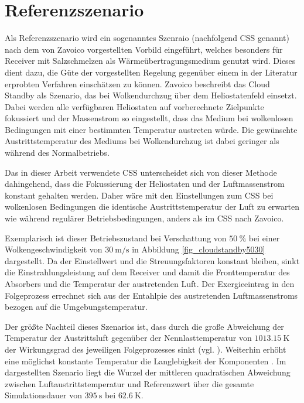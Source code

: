 \section{Referenzszenario} \label{sec_Referenzszenario}
Als Referenzszenario wird ein sogenanntes  Szenraio (nachfolgend CSS genannt) nach dem von Zavoico \cite[S.25ff]{Zavoico} vorgestellten Vorbild eingeführt, welches besonders für Receiver mit Salzschmelzen als Wärmeübertragungsmedium genutzt wird.
Dieses dient dazu, die Güte der vorgestellten Regelung gegenüber einem in der Literatur erprobten Verfahren einschätzen zu können.
Zavoico beschreibt das Cloud Standby als Szenario, das bei Wolkendurchzug über dem Heliostatenfeld einsetzt.
Dabei werden alle verfügbaren Heliostaten auf vorberechnete Zielpunkte fokussiert und der Massenstrom so eingestellt, dass das Medium bei wolkenlosen Bedingungen mit einer bestimmten Temperatur austreten würde.
Die gewünschte Austrittstemperatur des Mediums bei Wolkendurchzug ist dabei geringer als während des Normalbetriebs.

Das in dieser Arbeit verwendete CSS unterscheidet sich von dieser Methode dahingehend, dass die Fokussierung der Heliostaten und der Luftmassenstrom konstant gehalten werden.
Daher wäre mit den Einstellungen zum CSS bei wolkenlosen Bedingungen die identische Austrittstemperatur der Luft zu erwarten wie während regulärer Betriebsbedingungen, anders als im CSS nach Zavoico.

Exemplarisch ist dieser Betriebszustand bei Verschattung von $\SI{50}{\percent}$ bei einer Wolkengeschwindigkeit von $\SI{30}{\metre\per\second}$ in Abbildung \ref{fig_cloudstandby5030} dargestellt.
Da der Einstellwert und die Streuungsfaktoren konstant bleiben, sinkt die Einstrahlungsleistung auf dem Receiver und damit die Fronttemperatur des Absorbers und die Temperatur der austretenden Luft.
Der Exergieeintrag in den Folgeprozess errechnet sich aus der Entahlpie des austretenden Luftmassenstroms bezogen auf die Umgebungstemperatur.

Der größte Nachteil dieses Szenarios ist, dass durch die große Abweichung der Temperatur der Austrittsluft gegenüber der Nennlasttemperatur von $\SI{1013.15}{\kelvin}$ \cite[S.29]{HandbuchJülich} der Wirkungsgrad des jeweiligen Folgeprozesses sinkt (vgl. \cite[S.15ff]{DissGall}).
Weiterhin erhöht eine möglichst konstante Temperatur die Langlebigkeit der Komponenten \cite{DissUtz}.
Im dargestellten Szenario liegt die Wurzel der mittleren quadratischen Abweichung zwischen Luftaustrittstemperatur und Referenzwert über die gesamte Simulationsdauer von $\SI{395}{\second}$ bei $\SI{62.6}{\kelvin}$.

